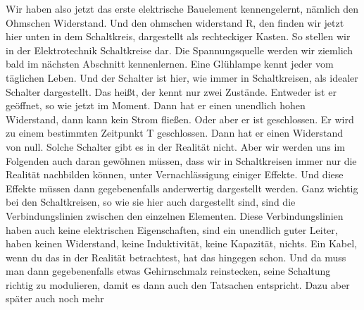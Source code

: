 \begin{frame}
	\begin{figure}[H]
		\centering
		\hspace{1cm} %
		

		\label{fig:erstes_schaltbild}
	\end{figure}
	{Wir haben also jetzt das erste elektrische Bauelement kennengelernt, nämlich den Ohmschen Widerstand. Und den ohmschen widerstand R, den finden wir jetzt hier unten in dem Schaltkreis, dargestellt als rechteckiger Kasten. So stellen wir in der Elektrotechnik Schaltkreise dar. Die Spannungsquelle werden wir ziemlich bald im nächsten Abschnitt kennenlernen. Eine Glühlampe kennt jeder vom täglichen Leben. Und der Schalter ist hier, wie immer in Schaltkreisen, als idealer Schalter dargestellt. Das heißt, der kennt nur zwei Zustände. Entweder ist er geöffnet, so wie jetzt im Moment. Dann hat er einen unendlich hohen Widerstand, dann kann kein Strom fließen. Oder aber er ist geschlossen. Er wird zu einem bestimmten Zeitpunkt T geschlossen. Dann hat er einen Widerstand von null. Solche Schalter gibt es in der Realität nicht. Aber wir werden uns im Folgenden auch daran gewöhnen müssen, dass wir in Schaltkreisen immer nur die Realität nachbilden können, unter Vernachlässigung einiger Effekte. Und diese Effekte müssen dann gegebenenfalls anderwertig dargestellt werden. Ganz wichtig bei den Schaltkreisen, so wie sie hier auch dargestellt sind, sind die Verbindungslinien zwischen den einzelnen Elementen. Diese Verbindungslinien haben auch keine elektrischen Eigenschaften, sind ein unendlich guter Leiter, haben keinen Widerstand, keine Induktivität, keine Kapazität, nichts. Ein Kabel, wenn du das in der Realität betrachtest, hat das hingegen schon. Und da muss man dann gegebenenfalls etwas Gehirnschmalz reinstecken, seine Schaltung richtig zu modulieren, damit es dann auch den Tatsachen entspricht. Dazu aber später auch noch mehr}
\end{frame}
